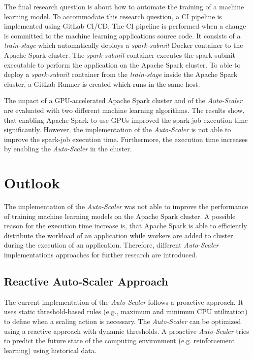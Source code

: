The final research question is about how to automate the training of a machine learning model.
%
To accommodate this research question, a CI pipeline is implemented using GitLab CI/CD. The CI pipeline is performed when a change is committed to the machine learning applications source code.
It consists of a \textit{train-stage} which automatically deploys a \textit{spark-submit} Docker container to the Apache Spark cluster.
The \textit{spark-submit} container executes the spark-submit executable to perform the application on the Apache Spark cluster.
To able to deploy a \textit{spark-submit} container from the \textit{train-stage} inside the Apache Spark cluster, a GitLab Runner is created which runs in the same host.


The impact of a GPU-accelerated Apache Spark cluster and of the \textit{Auto-Scaler} are evaluated with two different machine learning algorithms.
The results show, that enabling Apache Spark to use GPUs improved the spark-job execution time significantly.
However, the implementation of the \textit{Auto-Scaler} is not able to improve the spark-job execution time. Furthermore, the execution time increases by enabling the \textit{Auto-Scaler} in the cluster.


\section{Outlook}
The implementation of the \textit{Auto-Scaler} was not able to improve the performance of training machine learning models on the Apache Spark cluster.
A possible reason for the execution time increase is, that Apache Spark is able to efficiently distribute the workload of an application while workers are added to cluster during the execution of an application.
Therefore, different \textit{Auto-Scaler} implementations approaches for further research are introduced.


\subsection{Reactive Auto-Scaler Approach}
The current implementation of the \textit{Auto-Scaler} follows a proactive approach. It uses static threshold-based rules (e.g., maximum and minimum CPU utilization) to define when a scaling action is necessary.
The \textit{Auto-Scaler} can be optimized using a reactive approach with dynamic thresholds. A proactive \textit{Auto-Scaler} tries to predict the future state of the computing environment (e.g. reinforcement learning) using historical data.


